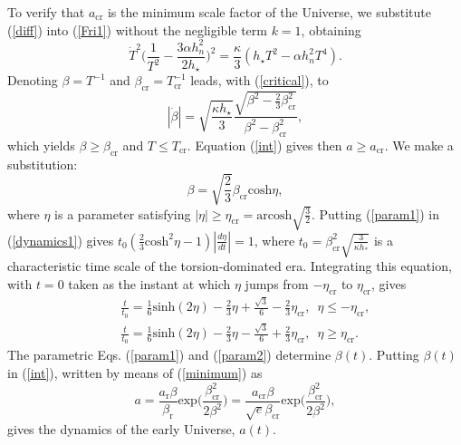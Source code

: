 \documentclass[prd,onecolumn,nofootinbib,showpacs]{revtex4}
\begin{document}
To verify that $a_\textrm{cr}$ is the minimum scale factor of the Universe, we substitute (\ref{diff}) into (\ref{Fri1}) without the negligible term $k=1$, obtaining
\begin{equation}
\dot{T}^2\biggl(\frac{1}{T^2}-\frac{3\alpha h^2_n}{2h_\star}\biggr)^2=\frac{\kappa}{3}(h_\star T^2-\alpha h^2_n T^4).
\label{scaling}
\end{equation}
Denoting $\beta=T^{-1}$ and $\beta_\textrm{cr}=T^{-1}_\textrm{cr}$ leads, with (\ref{critical}), to
\begin{equation}
|\dot{\beta}|=\sqrt{\frac{\kappa h_\star}{3}}\frac{\sqrt{\beta^2-\frac{2}{3}\beta^2_\textrm{cr}}}{\beta^2-\beta^2_\textrm{cr}},
\label{dynamics1}
\end{equation}
which yields $\beta\ge\beta_\textrm{cr}$ and $T\le T_\textrm{cr}$.
Equation (\ref{int}) gives then $a\ge a_\textrm{cr}$.
We make a substitution:
\begin{equation}
\beta=\sqrt{\frac{2}{3}}\beta_\textrm{cr}\mbox{cosh}\eta,
\label{param1}
\end{equation}
where $\eta$ is a parameter satisfying $|\eta|\ge\eta_\textrm{cr}=\mbox{arcosh}\sqrt{\frac{3}{2}}$.
Putting (\ref{param1}) in (\ref{dynamics1}) gives $t_0(\frac{2}{3}\mbox{cosh}^2\eta-1)|\frac{d\eta}{dt}|=1$, where $t_0=\beta^2_\textrm{cr}\sqrt{\frac{3}{\kappa h_\ast}}$ is a characteristic time scale of the torsion-dominated era.
Integrating this equation, with $t=0$ taken as the instant at which $\eta$ jumps from $-\eta_\textrm{cr}$ to $\eta_\textrm{cr}$, gives 
\begin{eqnarray}
& & \frac{t}{t_0}=\frac{1}{6}\mbox{sinh}(2\eta)-\frac{2}{3}\eta+\frac{\sqrt{3}}{6}-\frac{2}{3}\eta_\textrm{cr},\,\,\,\eta\le-\eta_\textrm{cr}, \nonumber \\
& & \frac{t}{t_0}=\frac{1}{6}\mbox{sinh}(2\eta)-\frac{2}{3}\eta-\frac{\sqrt{3}}{6}+\frac{2}{3}\eta_\textrm{cr},\,\,\,\eta\ge\eta_\textrm{cr}.
\label{param2}
\end{eqnarray}
The parametric Eqs. (\ref{param1}) and (\ref{param2}) determine $\beta(t)$.
Putting $\beta(t)$ in (\ref{int}), written by means of (\ref{minimum}) as
\begin{equation}
a=\frac{a_\textrm{r}\beta}{\beta_\textrm{r}}\mbox{exp}\biggl(\frac{\beta^2_\textrm{cr}}{2\beta^2}\biggr)=\frac{a_\textrm{cr}\beta}{\sqrt{e}\beta_\textrm{cr}}\mbox{exp}\biggl(\frac{\beta^2_\textrm{cr}}{2\beta^2}\biggr),
\label{dynamics2}
\end{equation}
gives the dynamics of the early Universe, $a(t)$.
\end{document}
